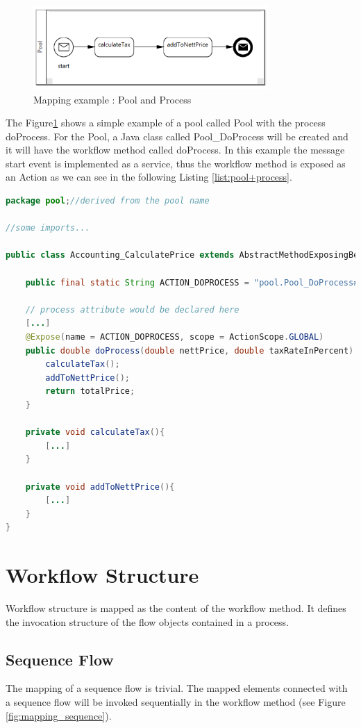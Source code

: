 \begin{figure}[h]
	\centering
		\includegraphics[width=0.80\textwidth]{images/mapping/pool_and_process.png}
	\caption{Mapping example : Pool and Process}
	\label{fig:pool+process}
\end{figure}

The Figure\ref{fig:pool+process} shows a simple example of a pool called Pool with the process doProcess. For the Pool, a Java class called Pool\_DoProcess will be created and it will have the workflow method called doProcess. In this example the message start event is implemented as a service, thus the workflow method is exposed as an Action as we can see in the following Listing \ref{list:pool+process}.  
\begin{lstlisting}[language = Java, caption =  Mapped element: Pool and Process (Figure \ref{fig:pool+process}), label = list:pool+process]
package pool;//derived from the pool name

//some imports...

public class Accounting_CalculatePrice extends AbstractMethodExposingBean{
	
	public final static String ACTION_DOPROCESS = "pool.Pool_DoProcess#doProcess"; 
	
	// process attribute would be declared here
	[...]
	@Expose(name = ACTION_DOPROCESS, scope = ActionScope.GLOBAL)
	public double doProcess(double nettPrice, double taxRateInPercent) {
		calculateTax();
		addToNettPrice();
		return totalPrice;
	}
	
	private void calculateTax(){
		[...]
	}
	
	private void addToNettPrice(){
		[...]
	}
}
\end{lstlisting}


\section{Workflow Structure}
Workflow structure is mapped as the content of the workflow method. It defines the invocation structure of the flow objects contained in a process.

\subsection{Sequence Flow}
The mapping of a sequence flow is trivial. The mapped elements connected with a sequence flow will be invoked sequentially in the workflow method (see Figure \ref{fig:mapping_sequence}).\\

